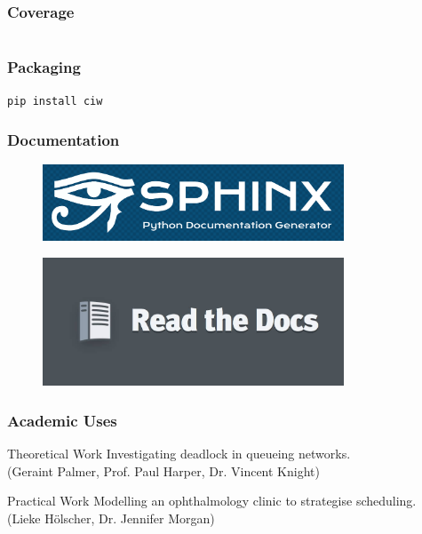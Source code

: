 \documentclass{beamer}
\begin{document}
\begin{frame}[fragile]
\frametitle{Coverage}
\fontsize{7pt}{9pt} \inputminted{python}{coverage_results.txt}
\end{frame}


\begin{frame}
\begin{figure}
    
\end{figure}
\end{frame}

\begin{frame}
\frametitle{Packaging}
\begin{center}
    \huge\texttt{pip install ciw}
\end{center}
\end{frame}

\begin{frame}
\begin{figure}
    
\end{figure}
\end{frame}

\begin{frame}
\frametitle{Documentation}
\begin{figure}
    \includegraphics[width=0.8\textwidth]{sphinxlogo}
\end{figure}
\begin{figure}
    \includegraphics[width=0.8\textwidth]{readthedocslogo}
\end{figure}
\end{frame}


\begin{frame}
\frametitle{Academic Uses}
\vfill
\begin{block}{Theoretical Work}
Investigating deadlock in queueing networks.\\
(Geraint Palmer, Prof. Paul Harper, Dr. Vincent Knight)
\end{block}
\vfill
\begin{block}{Practical Work}
Modelling an ophthalmology clinic to strategise scheduling.\\
(Lieke H\"{o}lscher, Dr. Jennifer Morgan)
\end{block}
\vfill
\end{frame}
\end{document}

